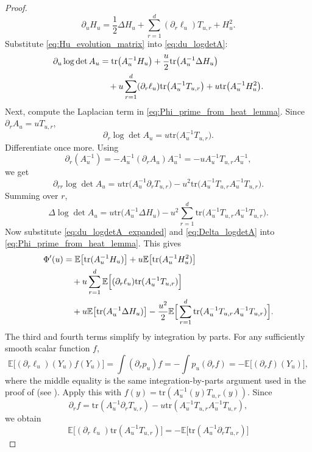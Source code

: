 \documentclass[11pt]{article}
\def\E{\mathbb{E}}
\newcommand{\tr}{\mathrm{tr}}
\begin{document}
\begin{proof}
\begin{equation}
\partial_u H_u
=
\frac12\Delta H_u
+
\sum_{r=1}^d (\partial_r\ell_u)T_{u,r}
+
H_u^2.
\end{equation}
Substitute \eqref{eq:Hu_evolution_matrix} into \eqref{eq:du_logdetA}:
\begin{align}
\label{eq:du_logdetA_expanded}
\partial_u\log\det A_u
&=
\tr\big(A_u^{-1}H_u\big)
+
\frac{u}{2}\tr\big(A_u^{-1}\Delta H_u\big) \notag\\
&\quad +
 u\sum_{r=1}^d (\partial_r\ell_u)\tr\big(A_u^{-1}T_{u,r}\big)
+
 u\tr\big(A_u^{-1}H_u^2\big).
\end{align}
Next, compute the Laplacian term in \eqref{eq:Phi_prime_from_heat_lemma}. Since \(\partial_r A_u = uT_{u,r}\),
\[
\partial_r \log\det A_u = u\tr\big(A_u^{-1}T_{u,r}\big).
\]
Differentiate once more. Using
\[
\partial_r(A_u^{-1}) = -A_u^{-1}(\partial_r A_u)A_u^{-1} = -uA_u^{-1}T_{u,r}A_u^{-1},
\]
we get
\[
\partial_{rr}\log\det A_u
=
 u\tr\big(A_u^{-1}\partial_r T_{u,r}\big)
-
 u^2\tr\big(A_u^{-1}T_{u,r}A_u^{-1}T_{u,r}\big).
\]
Summing over \(r\),
\begin{equation}
\label{eq:Delta_logdetA}
\Delta\log\det A_u
=
 u\tr\big(A_u^{-1}\Delta H_u\big)
-
 u^2\sum_{r=1}^d \tr\big(A_u^{-1}T_{u,r}A_u^{-1}T_{u,r}\big).
\end{equation}
Now substitute \eqref{eq:du_logdetA_expanded} and \eqref{eq:Delta_logdetA} into \eqref{eq:Phi_prime_from_heat_lemma}. This gives
\begin{align}
\label{eq:Phi_prime_preIBP}
\Phi'(u)
&=
\E\big[\tr(A_u^{-1}H_u)\big]
+
 u\E\big[\tr(A_u^{-1}H_u^2)\big] \notag\\
&\quad +
 u\sum_{r=1}^d \E\Big[(\partial_r\ell_u)\tr(A_u^{-1}T_{u,r})\Big] \notag\\
&\quad +
 u\E\big[\tr(A_u^{-1}\Delta H_u)\big]
-
 \frac{u^2}{2}
\E\Big[\sum_{r=1}^d \tr(A_u^{-1}T_{u,r}A_u^{-1}T_{u,r})\Big].
\end{align}
The third and fourth terms simplify by integration by parts. For any sufficiently smooth scalar function \(f\),
\[
\E\big[(\partial_r\ell_u)(Y_u)f(Y_u)\big]
=
\int (\partial_r p_u)f
=
-\int p_u(\partial_r f)
=
-\E\big[(\partial_r f)(Y_u)\big],
\]
where the middle equality is the same integration-by-parts argument used in the proof of  (see ).
Apply this with \(f(y)=\tr(A_u^{-1}(y)T_{u,r}(y))\). Since
\[
\partial_r f
=
\tr(A_u^{-1}\partial_r T_{u,r}) - u\tr(A_u^{-1}T_{u,r}A_u^{-1}T_{u,r}),
\]
we obtain
\[
\E\Big[(\partial_r\ell_u)\tr(A_u^{-1}T_{u,r})\Big]
=
-\E\big[\tr(A_u^{-1}\partial_r T_{u,r})\big]
\]
\end{proof}
\end{document}
